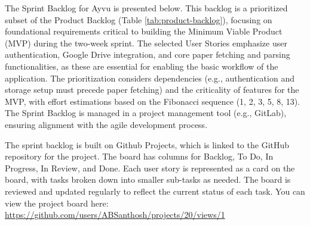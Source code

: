 \documentclass[12pt]{article}
\begin{document}
The Sprint Backlog for Ayvu is presented below. This backlog is a prioritized subset of the Product Backlog (Table \ref{tab:product-backlog}), focusing on foundational requirements critical to building the Minimum Viable Product (MVP) during the two-week sprint. The selected User Stories emphasize user authentication, Google Drive integration, and core paper fetching and parsing functionalities, as these are essential for enabling the basic workflow of the application. The prioritization considers dependencies (e.g., authentication and storage setup must precede paper fetching) and the criticality of features for the MVP, with effort estimations based on the Fibonacci sequence (1, 2, 3, 5, 8, 13). The Sprint Backlog is managed in a project management tool (e.g., GitLab), ensuring alignment with the agile development process.

The sprint backlog is built on Github Projects, which is linked to the GitHub repository for the project. The board has columns for Backlog, To Do, In Progress, In Review, and Done. Each user story is represented as a card on the board, with tasks broken down into smaller sub-tasks as needed. The board is reviewed and updated regularly to reflect the current status of each task. You can view the project board here: \url{https://github.com/users/ABSanthosh/projects/20/views/1}
\end{document}
